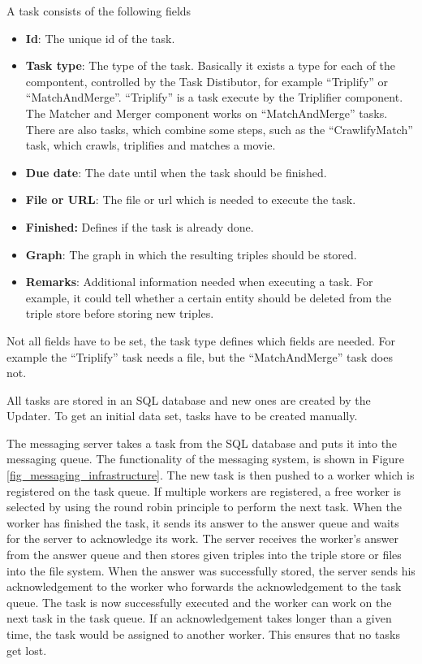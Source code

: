 A task consists of the following fields
\begin{itemize}
  \item \textbf{Id}:
  The unique id of the task.
  \item \textbf{Task type}:
   The type of the task.
  Basically it exists a type for each of the compontent, controlled by the Task Distibutor, for example ``Triplify'' or ``MatchAndMerge''.
  ``Triplify'' is a task execute by the Triplifier component.
  The Matcher and Merger component works on ``MatchAndMerge'' tasks.
  There are also tasks, which combine some steps, such as the ``CrawlifyMatch'' task, which crawls, triplifies and matches a movie.
  \item \textbf{Due date}:
  The date until when the task should be finished.
  \item \textbf{File or URL}:
  The file or url which is needed to execute the task.
  \item \textbf{Finished:}
  Defines if the task is already done.
  \item \textbf{Graph}:
  The graph in which the resulting triples should be stored.
  \item \textbf{Remarks}:
  Additional information needed when executing a task.
  For example, it could tell whether a certain entity should be deleted from the triple store before storing new triples.
\end{itemize}
Not all fields have to be set, the task type defines which fields are needed.
For example the ``Triplify'' task needs a file, but the ``MatchAndMerge'' task does not.

All tasks are stored in an SQL database and new ones are created by the Updater.
To get an initial data set, tasks have to be created manually.

The messaging server takes a task from the SQL database and puts it into the messaging queue.
The functionality of the messaging system, is shown in Figure \ref{fig_messaging_infrastructure}.
The new task is then pushed to a worker which is registered on the task queue.
If multiple workers are registered, a free worker is selected by using the round robin principle to perform the next task.
When the worker has finished the task, it sends its answer to the answer queue and waits for the server to acknowledge its work.
The server receives the worker's answer from the answer queue and then stores given triples into the triple store or files into the file system.
When the answer was successfully stored, the server sends his acknowledgement to the worker who forwards the acknowledgement to the task queue.
The task is now successfully executed and the worker can work on the next task in the task queue.
If an acknowledgement takes longer than a given time, the task would be assigned to another worker.
This ensures that no tasks get lost.

